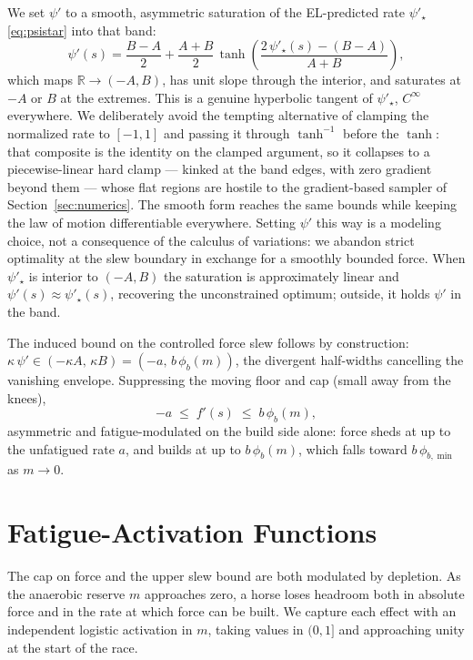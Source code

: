 \documentclass[11pt]{article}
\begin{document}
We set $\psi'$ to a smooth, asymmetric saturation of the EL-predicted rate $\psi'_\star$ \eqref{eq:psistar} into that band:
\begin{equation}\label{eq:slew-squash}
\psi'(s) = \frac{B - A}{2} + \frac{A + B}{2}\,\tanh\!\left(\frac{2\,\psi'_{\star}(s) - (B - A)}{A + B}\right),
\end{equation}
which maps $\mathbb{R} \to (-A, B)$, has unit slope through the interior, and saturates at $-A$ or $B$ at the extremes. This is a genuine hyperbolic tangent of $\psi'_\star$, $C^\infty$ everywhere. We deliberately avoid the tempting alternative of clamping the normalized rate to $[-1, 1]$ and passing it through $\tanh^{-1}$ before the $\tanh$: that composite is the identity on the clamped argument, so it collapses to a piecewise-linear hard clamp --- kinked at the band edges, with zero gradient beyond them --- whose flat regions are hostile to the gradient-based sampler of Section~\ref{sec:numerics}. The smooth form reaches the same bounds while keeping the law of motion differentiable everywhere. Setting $\psi'$ this way is a modeling choice, not a consequence of the calculus of variations: we abandon strict optimality at the slew boundary in exchange for a smoothly bounded force. When $\psi'_\star$ is interior to $(-A, B)$ the saturation is approximately linear and $\psi'(s) \approx \psi'_{\star}(s)$, recovering the unconstrained optimum; outside, it holds $\psi'$ in the band.

The induced bound on the controlled force slew follows by construction: $\kappa\,\psi' \in (-\kappa A,\, \kappa B) = (-a,\, b\,\phi_b(m))$, the divergent half-widths cancelling the vanishing envelope. Suppressing the moving floor and cap (small away from the knees),
\begin{equation}\label{eq:slew-fprime}
-a \;\leq\; f'(s) \;\leq\; b\, \phi_b(m),
\end{equation}
asymmetric and fatigue-modulated on the build side alone: force sheds at up to the unfatigued rate $a$, and builds at up to $b\,\phi_b(m)$, which falls toward $b\,\phi_{b,\min}$ as $m \to 0$.

\section{Fatigue-Activation Functions}\label{sec:fatigue}

The cap on force and the upper slew bound are both modulated by depletion. As the anaerobic reserve $m$ approaches zero, a horse loses headroom both in absolute force and in the rate at which force can be built. We capture each effect with an independent logistic activation in $m$, taking values in $(0, 1]$ and approaching unity at the start of the race.
\end{document}

